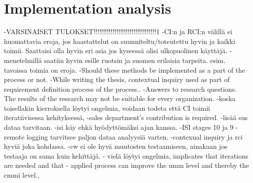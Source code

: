 \documentclass[12pt,a4paper,oneside,pdftex]{report}
\begin{document}
    \section{Implementation analysis}
    \label{sec:implementationanalysis}
    
    -VARSINAISET TULOKSET!!!!!!!!!!!!!!!!!!!!!!!!!!!!!!!!!1
    -CI:n ja RCI:n välillä ei huomattavia eroja, jos haastattelut on suunniteltu/toteutettu hyvin ja kaikki toimii. Saattaisi olla hyvin eri asia jos kyseessä olisi ulkopuolinen käyttäjä.
    -menetelmillä saatiin hyvin esille ruotsin ja suomen erilaisia tarpeita. esim. tavoissa toimia on eroja.
    -Should these methods be implemented as a part of the process or not.
    -While writing the thesis, contextual inquiry used as part of requirement definition process of the process..
    -Answers to research questions.
         The results of the research may not be suitable for every organization.
  -koska toisellakin kierroksella löytyi ongelmia, voidaan todeta että CI toimii iteratiivisessa kehityksessä,
  -sales department's contribution is required.
  -lisää sus dataa tarvitaan. 
  -isi käy ehkä hyödyttömäksi ajan kanssa. 
  -ISI stages 10 ja 9
  -remote logging tarvitsee paljon dataa analyysiä varten.
  -contexual inquiry ja rci hyviä joka kohdassa.
  -cw ei ole hyvä muutosten testaamiseen, ainakaan jos testaaja on sama kuin kehittäjä.
- vielä löytyi ongelmia, implicates that iterations are needed and that 
- applied process can improve the umm level and thereby the cmmi level.,



\end{document}
